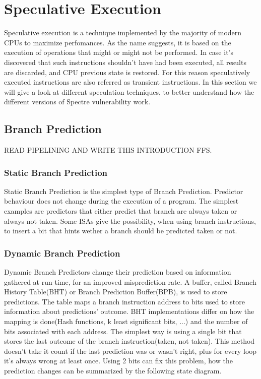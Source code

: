 \section{Speculative Execution}
Speculative execution is a technique implemented by the majority of modern CPUs to maximize perfomances. 
As the name suggests, it is based on the execution of operations that might or might not be performed.
In case it's discovered that such instructions shouldn't have had been executed, all results are discarded, and CPU previous state is restored.
For this reason speculatively executed instructions are also referred as transient instructions.
In this section we will give a look at different speculation techniques, to better understand how the different versions of Spectre vulnerability work.

\subsection{Branch Prediction}
READ PIPELINING AND WRITE THIS INTRODUCTION FFS.
\subsubsection{Static Branch Prediction}
Static Branch Prediction is the simplest type of Branch Prediction. Predictor behaviour does not change during the execution of a program. The simplest examples are predictors that either predict that branch are always taken or always not taken. Some ISAs give the possibility, when using branch instructions, to insert a bit that hints wether a branch should be predicted taken or not.
\subsubsection{Dynamic Branch Prediction}
Dynamic Branch Predictors change their prediction based on information gathered at run-time, for an improved misprediction rate. A buffer, called Branch History Table(BHT) or Branch Prediction Buffer(BPB), is used to store predictions.
The table maps a branch instruction address to bits used to store information about predictions' outcome. BHT implementations differ on how the mapping is done(Hash functions, k least significant bits, ...) and the number of bits associated with each address. The simplest way is using a single bit that stores the last outcome of the branch instruction(taken, not taken).
This method doesn't take it count if the last prediction was or wasn't right, plus for every loop it's always wrong at least once. Using 2 bits can fix this problem, how the prediction changes can be summarized by the following state diagram.


